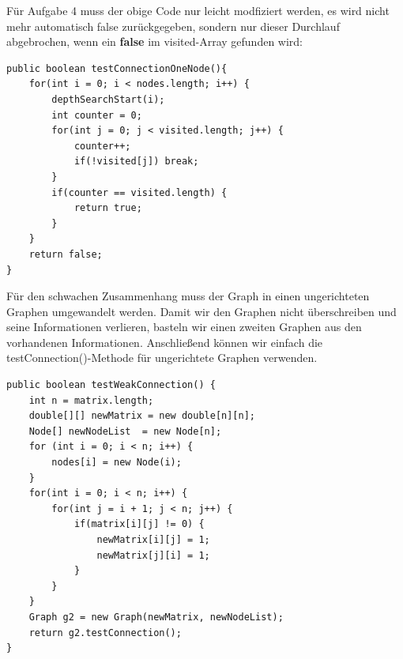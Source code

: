 \documentclass{article}
\begin{document}
Für Aufgabe 4 muss der obige Code nur leicht modfiziert werden, es wird nicht mehr automatisch false zurückgegeben, sondern nur dieser Durchlauf abgebrochen, wenn ein \textbf{false} im visited-Array gefunden wird:
\begin{verbatim}
public boolean testConnectionOneNode(){
    for(int i = 0; i < nodes.length; i++) {
        depthSearchStart(i);
        int counter = 0;
        for(int j = 0; j < visited.length; j++) {
            counter++;
            if(!visited[j]) break;
        }
        if(counter == visited.length) {
            return true;
        }
    }
    return false;
}
\end{verbatim}
Für den schwachen Zusammenhang muss der Graph in einen ungerichteten Graphen umgewandelt werden. Damit wir den Graphen nicht überschreiben und seine Informationen verlieren, basteln wir einen zweiten Graphen aus den vorhandenen Informationen. Anschließend können wir einfach die testConnection()-Methode für ungerichtete Graphen verwenden.
\begin{verbatim}
public boolean testWeakConnection() {
    int n = matrix.length;
    double[][] newMatrix = new double[n][n];
    Node[] newNodeList  = new Node[n];
    for (int i = 0; i < n; i++) {
        nodes[i] = new Node(i);
    }
    for(int i = 0; i < n; i++) {
        for(int j = i + 1; j < n; j++) {
            if(matrix[i][j] != 0) {
                newMatrix[i][j] = 1;
                newMatrix[j][i] = 1;
            }
        }
    }
    Graph g2 = new Graph(newMatrix, newNodeList);
    return g2.testConnection();
}
\end{verbatim}
\end{document}
